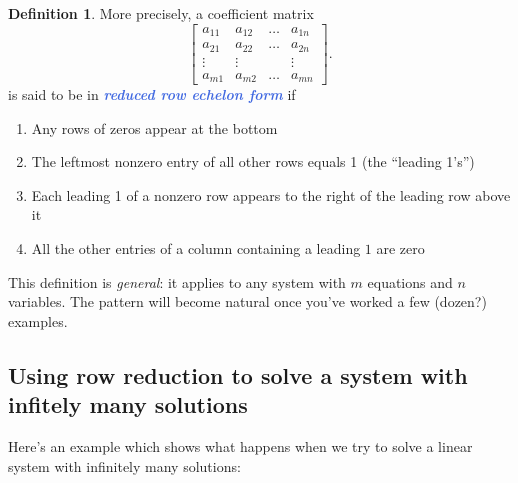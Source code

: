 \documentclass[10pt]{article}
\newcommand{\demph}[1]{\textcolor{RoyalBlue}{\textbf{\slshape #1}}} %
\theoremstyle{definition}
\newtheorem{definition}[theorem]{Definition}
\begin{document}
\begin{definition}
  More precisely, a coefficient matrix
  \begin{equation*}
    \begin{bmatrix}
      a_{11}&a_{12}&\ldots& a_{1n}\\
      a_{21}&a_{22}&\ldots& a_{2n}\\
      \vdots&\vdots & &\vdots \\
      a_{m1}&a_{m2}&\ldots& a_{mn}
    \end{bmatrix}.
  \end{equation*}
  is said to be in \demph{reduced row echelon form} if
  \begin{enumerate}
    \item Any rows of zeros appear at the bottom
    \item The leftmost nonzero entry of all other rows equals 1 (the ``leading
    1's'')
    \item Each leading 1 of a nonzero row appears to the right of the leading
    row above it
    \item All the other entries of a column containing a leading $1$ are zero
  \end{enumerate}
\end{definition}
This definition is \textit{general}: it applies to any system with $m$ equations and
$n$ variables. The pattern will become natural once you've worked a few
(dozen?) examples.

\subsection{Using row reduction to solve a system with infitely many
solutions}

Here's an example which shows what happens when we try to solve a linear
system with infinitely many solutions:
\end{document}
